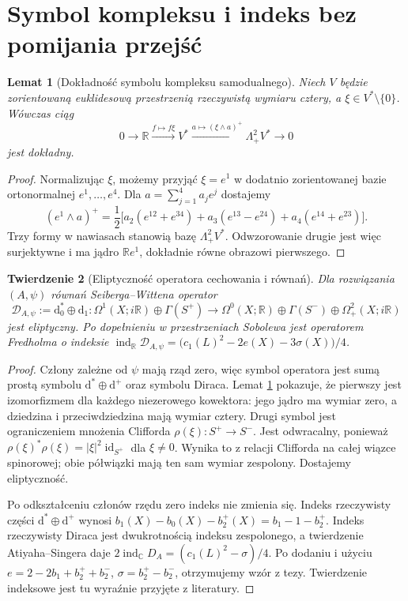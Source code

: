 \documentclass[11pt,a4paper]{report}
\numberwithin{equation}{section}
\theoremstyle{plain}
\newtheorem{twierdzenie}{Twierdzenie}[section]
\newtheorem{lemat}[twierdzenie]{Lemat}
\theoremstyle{definition}
\theoremstyle{remark}
\begin{document}
\section{Symbol kompleksu i indeks bez pomijania przejść}
\label{sec:tg-sw12-symbol}

\begin{lemat}[Dokładność symbolu kompleksu samodualnego]
\label{lem:tg-sw12-symbol}
Niech $V$ będzie zorientowaną euklidesową przestrzenią
rzeczywistą wymiaru cztery, a $\xi\in V^*\setminus\{0\}$.
Wówczas ciąg
\[
0\longrightarrow\mathbb R
\xrightarrow{f\mapsto f\xi}V^*
\xrightarrow{a\mapsto(\xi\wedge a)^+}\Lambda^2_+V^*
\longrightarrow0
\]
jest dokładny.
\end{lemat}

\begin{proof}
Normalizując $\xi$, możemy przyjąć $\xi=e^1$ w dodatnio
zorientowanej bazie ortonormalnej $e^1,\dots,e^4$.
Dla $a=\sum_{j=1}^4a_je^j$ dostajemy
\[
(e^1\wedge a)^+=\frac12\bigl[
 a_2(e^{12}+e^{34})+a_3(e^{13}-e^{24})
 +a_4(e^{14}+e^{23})\bigr].
\]
Trzy formy w nawiasach stanowią bazę $\Lambda^2_+V^*$.
Odwzorowanie drugie jest więc surjektywne i ma jądro
$\mathbb Re^1$, dokładnie równe obrazowi pierwszego.
\end{proof}

\begin{twierdzenie}[Eliptyczność operatora cechowania i równań]
\label{thm:tg-sw12-fredholm}
Dla rozwiązania $(A,\psi)$ równań Seiberga--Wittena operator
\[
\mathcal D_{A,\psi}:=\mathrm d_0^*\oplus\mathrm d_1:
\Omega^1(X;i\mathbb R)\oplus\Gamma(S^+)
\longrightarrow
\Omega^0(X;\mathbb R)\oplus\Gamma(S^-)
\oplus\Omega^2_+(X;i\mathbb R)
\]
jest eliptyczny. Po dopełnieniu w przestrzeniach Sobolewa
jest operatorem Fredholma o indeksie
$\operatorname{ind}_\mathbb R\mathcal D_{A,\psi}
=\bigl(c_1(L)^2-2e(X)-3\sigma(X)\bigr)/4$.
\end{twierdzenie}

\begin{proof}
Człony zależne od $\psi$ mają rząd zero, więc symbol
operatora jest sumą prostą symbolu
$\mathrm d^*\oplus\mathrm d^+$ oraz symbolu Diraca.
Lemat \ref{lem:tg-sw12-symbol} pokazuje, że pierwszy jest
izomorfizmem dla każdego niezerowego kowektora: jego jądro
ma wymiar zero, a dziedzina i przeciwdziedzina mają
wymiar cztery. Drugi symbol jest ograniczeniem mnożenia Clifforda
$\rho(\xi)\colon S^+\to S^-$. Jest odwracalny,
ponieważ $\rho(\xi)^*\rho(\xi)=
|\xi|^2\operatorname{id}_{S^+}$ dla $\xi\ne0$.
Wynika to z relacji Clifforda na całej wiązce spinorowej;
obie półwiązki mają ten sam wymiar zespolony.
Dostajemy eliptyczność.

Po odkształceniu członów rzędu zero indeks nie zmienia
się. Indeks rzeczywisty części $\mathrm d^*\oplus\mathrm d^+$
wynosi $b_1(X)-b_0(X)-b_2^+(X)=b_1-1-b_2^+$.
Indeks rzeczywisty Diraca jest dwukrotnością indeksu
zespolonego, a twierdzenie Atiyaha--Singera daje
$2\operatorname{ind}_\mathbb C D_A=(c_1(L)^2-\sigma)/4$.
Po dodaniu i użyciu $e=2-2b_1+b_2^++b_2^-$,
$\sigma=b_2^+-b_2^-$, otrzymujemy wzór z tezy.
Twierdzenie indeksowe jest tu wyraźnie przyjęte z literatury.
\end{proof}
\end{document}
